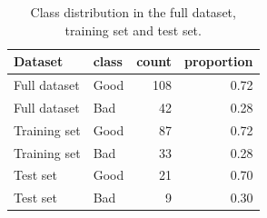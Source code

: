 \begin{table}[ht]
\centering
\begin{tabular}{llrr}
  \hline
Dataset & class & count & proportion \\ 
  \hline
Full dataset & Good & 108 & 0.72 \\ 
  Full dataset & Bad &  42 & 0.28 \\ 
  Training set & Good &  87 & 0.72 \\ 
  Training set & Bad &  33 & 0.28 \\ 
  Test set & Good &  21 & 0.70 \\ 
  Test set & Bad &   9 & 0.30 \\ 
   \hline
\end{tabular}
\caption{Class distribution in the full dataset, training set and test set.} 
\label{tab:class_distribution}
\end{table}
